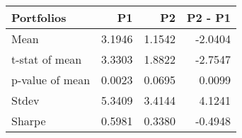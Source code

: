 \begin{tabular}{lrrr}
\toprule
Portfolios & P1 & P2 & P2 - P1 \\
\midrule
Mean & 3.1946 & 1.1542 & -2.0404 \\
t-stat of mean & 3.3303 & 1.8822 & -2.7547 \\
p-value of mean & 0.0023 & 0.0695 & 0.0099 \\
Stdev & 5.3409 & 3.4144 & 4.1241 \\
Sharpe & 0.5981 & 0.3380 & -0.4948 \\
\bottomrule
\end{tabular}
